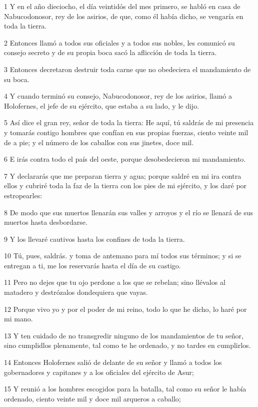 \par 1 Y en el año dieciocho, el día veintidós del mes primero, se habló en casa de Nabucodonosor, rey de los asirios, de que, como él había dicho, se vengaría en toda la tierra.
\par 2 Entonces llamó a todos sus oficiales y a todos sus nobles, les comunicó su consejo secreto y de su propia boca sacó la aflicción de toda la tierra.
\par 3 Entonces decretaron destruir toda carne que no obedeciera el mandamiento de su boca.
\par 4 Y cuando terminó su consejo, Nabucodonosor, rey de los asirios, llamó a Holofernes, el jefe de su ejército, que estaba a su lado, y le dijo.
\par 5 Así dice el gran rey, señor de toda la tierra: He aquí, tú saldrás de mi presencia y tomarás contigo hombres que confían en sus propias fuerzas, ciento veinte mil de a pie; y el número de los caballos con sus jinetes, doce mil.
\par 6 E irás contra todo el país del oeste, porque desobedecieron mi mandamiento.
\par 7 Y declararás que me preparan tierra y agua; porque saldré en mi ira contra ellos y cubriré toda la faz de la tierra con los pies de mi ejército, y los daré por estropearles:
\par 8 De modo que sus muertos llenarán sus valles y arroyos y el río se llenará de sus muertos hasta desbordarse.
\par 9 Y los llevaré cautivos hasta los confines de toda la tierra.
\par 10 Tú, pues, saldrás. y toma de antemano para mí todos sus términos; y si se entregan a ti, me los reservarás hasta el día de su castigo.
\par 11 Pero no dejes que tu ojo perdone a los que se rebelan; sino llévalos al matadero y destrózalos dondequiera que vayas.
\par 12 Porque vivo yo y por el poder de mi reino, todo lo que he dicho, lo haré por mi mano.
\par 13 Y ten cuidado de no transgredir ninguno de los mandamientos de tu señor, sino cumplidlos plenamente, tal como te he ordenado, y no tardes en cumplirlos.
\par 14 Entonces Holofernes salió de delante de su señor y llamó a todos los gobernadores y capitanes y a los oficiales del ejército de Asur;
\par 15 Y reunió a los hombres escogidos para la batalla, tal como su señor le había ordenado, ciento veinte mil y doce mil arqueros a caballo;
